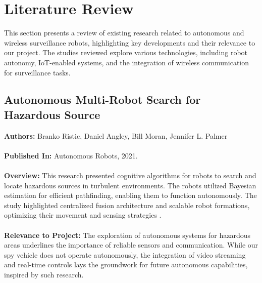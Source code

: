 \documentclass[12pt,a4paper]{report}
\begin{document}
\section{Literature Review}

This section presents a review of existing research related to autonomous and wireless surveillance robots, highlighting key developments and their relevance to our project. The studies reviewed explore various technologies, including robot autonomy, IoT-enabled systems, and the integration of wireless communication for surveillance tasks.

\subsection{Autonomous Multi-Robot Search for Hazardous Source}
\label{Autonomous Multi-Robot Search for Hazardous Source}
\textbf{Authors:} Branko Ristic, Daniel Angley, Bill Moran, Jennifer L. Palmer \\ \\
\textbf{Published In:} Autonomous Robots, 2021. \\ \\
\textbf{Overview:} This research presented cognitive algorithms for robots to search and locate hazardous sources in turbulent environments. The robots utilized Bayesian estimation for efficient pathfinding, enabling them to function autonomously. The study highlighted centralized fusion architecture and scalable robot formations, optimizing their movement and sensing strategies \cite{robotsearch}. \\ \\
\textbf{Relevance to Project:} The exploration of autonomous systems for hazardous areas underlines the importance of reliable sensors and communication. While our spy vehicle does not operate autonomously, the integration of video streaming and real-time controls lays the groundwork for future autonomous capabilities, inspired by such research.
\end{document}
